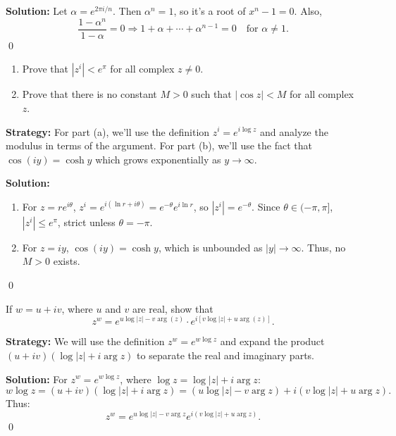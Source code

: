 \bigskip\noindent\textbf{Solution:}
Let \( \alpha = e^{2\pi i/n} \). Then \( \alpha^n = 1 \), so it's a root of \( x^n - 1 = 0 \). Also,
\[
\frac{1 - \alpha^n}{1 - \alpha} = 0 \Rightarrow 1 + \alpha + \cdots + \alpha^{n-1} = 0 \quad \text{for } \alpha \ne 1.
\]\qed


\begin{problembox}
\begin{enumerate}[label=\alph*)]
\item Prove that \( |z^i| < e^{\pi} \) for all complex \( z \ne 0 \).
\item Prove that there is no constant \( M > 0 \) such that \( |\cos z| < M \) for all complex \( z \).
\end{enumerate}
\end{problembox}

\noindent\textbf{Strategy:} For part (a), we'll use the definition $z^i = e^{i\log z}$ and analyze the modulus in terms of the argument. For part (b), we'll use the fact that $\cos(iy) = \cosh y$ which grows exponentially as $y \to \infty$.

\bigskip\noindent\textbf{Solution:}
\begin{enumerate}[label=\alph*)]
\item For \( z = re^{i\theta} \), \( z^i = e^{i(\ln r + i\theta)} = e^{-\theta} e^{i \ln r} \), so \( |z^i| = e^{-\theta} \). Since \( \theta \in (-\pi, \pi] \), \( |z^i| \leq e^{\pi} \), strict unless \( \theta = -\pi \).
\item For \( z = iy \), \( \cos(iy) = \cosh y \), which is unbounded as \( |y| \to \infty \). Thus, no \( M > 0 \) exists.
\end{enumerate}\qed


\begin{problembox}
If \( w = u + iv \), where \( u \) and \( v \) are real, show that
\[
z^w = e^{u \log |z| - v \arg(z)} \cdot e^{i[v \log |z| + u \arg(z)]}.
\]
\end{problembox}

\noindent\textbf{Strategy:} We will use the definition $z^w = e^{w \log z}$ and expand the product $(u + iv)(\log |z| + i \arg z)$ to separate the real and imaginary parts.

\bigskip\noindent\textbf{Solution:}
For \( z^w = e^{w \log z} \), where \( \log z = \log |z| + i \arg z \):
\[
w \log z = (u + iv)(\log |z| + i \arg z) = (u \log |z| - v \arg z) + i(v \log |z| + u \arg z).
\]
Thus:
\[
z^w = e^{u \log |z| - v \arg z} e^{i(v \log |z| + u \arg z)}.
\]\qed


